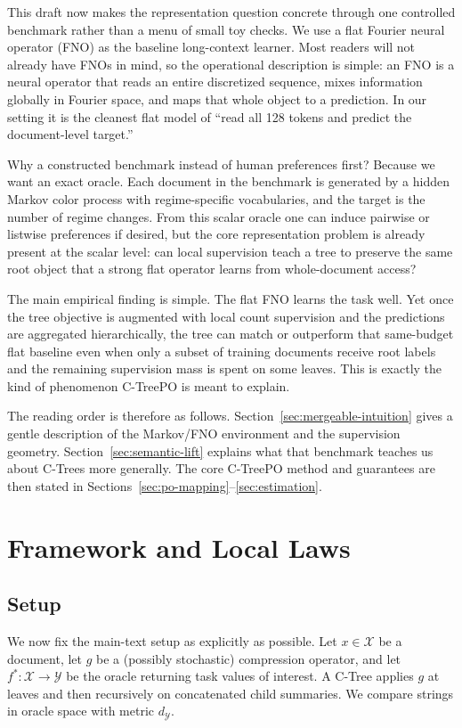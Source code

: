 \documentclass[11pt]{article}
\newcommand{\X}{\mathcal{X}}
\newcommand{\Y}{\mathcal{Y}}
\newcommand{\metric}{d_{\Y}}
\newcommand{\fstar}{f^\ast}
\begin{document}
This draft now makes the representation question concrete through one controlled benchmark rather than a menu of small toy checks. We use a flat Fourier neural operator (FNO) as the baseline long-context learner. Most readers will not already have FNOs in mind, so the operational description is simple: an FNO is a neural operator that reads an entire discretized sequence, mixes information globally in Fourier space, and maps that whole object to a prediction. In our setting it is the cleanest flat model of ``read all 128 tokens and predict the document-level target.''

Why a constructed benchmark instead of human preferences first? Because we want an exact oracle. Each document in the benchmark is generated by a hidden Markov color process with regime-specific vocabularies, and the target is the number of regime changes. From this scalar oracle one can induce pairwise or listwise preferences if desired, but the core representation problem is already present at the scalar level: can local supervision teach a tree to preserve the same root object that a strong flat operator learns from whole-document access?

The main empirical finding is simple. The flat FNO learns the task well. Yet once the tree objective is augmented with local count supervision and the predictions are aggregated hierarchically, the tree can match or outperform that same-budget flat baseline even when only a subset of training documents receive root labels and the remaining supervision mass is spent on some leaves. This is exactly the kind of phenomenon C-TreePO is meant to explain.

The reading order is therefore as follows. Section~\ref{sec:mergeable-intuition} gives a gentle description of the Markov/FNO environment and the supervision geometry. Section~\ref{sec:semantic-lift} explains what that benchmark teaches us about C-Trees more generally. The core C-TreePO method and guarantees are then stated in Sections~\ref{sec:po-mapping}--\ref{sec:estimation}.

\section{Framework and Local Laws}\label{sec:framework}

\subsection{Setup}

We now fix the main-text setup as explicitly as possible. Let $x\in\X$ be a document, let $g$ be a (possibly stochastic) compression operator, and let $\fstar:\X\to\Y$ be the oracle returning task values of interest. A C-Tree applies $g$ at leaves and then recursively on concatenated child summaries. We compare strings in oracle space with metric $\metric$.
\end{document}
